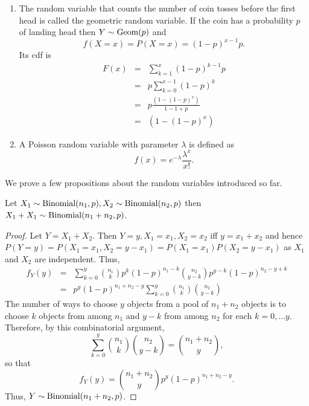 \documentclass{article}
\begin{document}
\begin{enumerate}
\item The random variable that counts the number of coin tosses before the first
head is called the geometric random variable. If the coin has a probability $p$
of landing head then $Y \sim \text{Geom}(p)$ and
\begin{equation}\label{c2e6}
f(X=x) = P(X=x) = (1 - p)^{x-1}p.
\end{equation}
Its cdf is
\begin{eqnarray}
F(x) &=& \sum_{k=1}^x (1-p)^{k-1}p \nonumber \\
 &=& p\sum_{k=0}^{x-1}(1 - p)^k \nonumber \\
 &=& p\frac{(1 - (1 - p)^x)}{1 - 1 + p} \nonumber \\
 &=& (1 - (1 - p)^x) \label{c2e7}
\end{eqnarray}

\item A Poisson random variable with parameter $\lambda$ is defined as 
\begin{equation}\label{c2e8}
f(x) = e^{-\lambda}\frac{\lambda^x}{x!}.
\end{equation}
\end{enumerate}

We prove a few propositions about the random variables introduced so far.
\begin{prop}\label{c2p3}
Let $X_1 \sim \text{Binomial}(n_1, p), X_2 \sim \text{Binomial}(n_2, p)$ then $X_1 + X_1 \sim
\text{Binomial}(n_1 + n_2, p)$.
\end{prop}
\begin{proof}
Let $Y = X_1 + X_2$. Then $Y = y, X_1 = x_1, X_2 = x_2$ iff $y = x_1 + x_2$ and
hence $P(Y = y) = P(X_1 = x_1, X_2 = y - x_1) = P(X_1 = x_1)P(X_2 = y - x_1)$
as $X_1$ and $X_2$ are independent. Thus,
\begin{eqnarray*}
f_Y(y) &=& \sum_{k=0}^y\binom{n_1}{k}p^{k}(1 - p)^{n_1 - k}\binom{n_2}{y - k}
p^{y - k}(1 - p)^{n_2 - y + k} \\
 &=& p^y(1 - p)^{n_1 + n_2 - y}
 \sum_{k=0}^y\binom{n_1}{k}\binom{n_2}{y - k}
\end{eqnarray*}
The number of ways to choose $y$ objects from a pool of $n_1 + n_2$ objects is
to choose $k$ objects from among $n_1$ and $y - k$ from among $n_2$ for each
$k = 0, \ldots y$. Therefore, by this combinatorial argument,
\[
\sum_{k=0}^y\binom{n_1}{k}\binom{n_2}{y - k} = \binom{n_1+n_2}{y},
\]
so that
\[
f_Y(y) = \binom{n_1+n_2}{y}p^y(1 - p)^{n_1 + n_2 - y}.
\]
Thus, $Y \sim \text{Binomial}(n_1 + n_2, p)$.
\end{proof}
\end{document}
